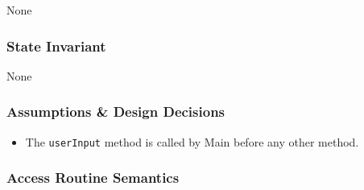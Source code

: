 \documentclass{article}
\begin{document}
None

\subsubsection* {State Invariant}

None

\subsubsection* {Assumptions \& Design Decisions}

\begin{itemize}
\item The \texttt{userInput} method is called by Main before any other method.
\end{itemize}

\newpage
\subsubsection* {Access Routine Semantics}
\end{document}
